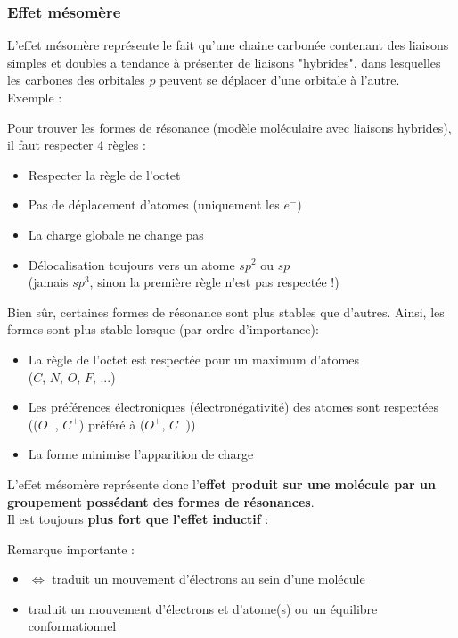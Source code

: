 \documentclass{article}
\newcommand{\insertslide}[2]{
\begin{center}
    \fbox{\texttt{[image: \#1]}}
\end{center}
}
\begin{document}
        \subsubsection{Effet mésomère}
            L'effet mésomère représente le fait qu'une chaine carbonée contenant des liaisons simples et doubles a tendance à présenter de liaisons "hybrides", dans lesquelles les carbones des orbitales $p$ peuvent se déplacer d'une orbitale à l'autre.\\
            Exemple :
            \insertslide{Slides/CM3}{32}
            Pour trouver les formes de résonance (modèle moléculaire avec liaisons hybrides), il faut respecter 4 règles :
            \begin{itemize}
                \item Respecter la règle de l'octet
                \item Pas de déplacement d'atomes (uniquement les $e^-$)
                \item La charge globale ne change pas
                \item Délocalisation toujours vers un atome $sp^2$ ou $sp$ \\(jamais $sp^3$, sinon la première règle n'est pas respectée !)
            \end{itemize}
\pagebreak
            Bien sûr, certaines formes de résonance sont plus stables que d'autres. Ainsi, les formes sont plus stable lorsque (par ordre d'importance):
            \begin{itemize}
                \item La règle de l'octet est respectée pour un maximum d'atomes \\($C$, $N$, $O$, $F$, ...)
                \item Les préférences électroniques (électronégativité) des atomes sont respectées \\(($O^-$, $C^+$) préféré à ($O^+$, $C^-$))
                \item La forme minimise l'apparition de charge
            \end{itemize}
            L'effet mésomère représente donc l'\textbf{effet produit sur une molécule par
            un groupement possédant des formes de résonances}. \\
            Il est toujours \textbf{plus fort que l'effet inductif} :
            \insertslide{Slides/CM3}{38}
            Remarque importante :\\
            \begin{itemize}
                \item $\Longleftrightarrow$ traduit un mouvement d'électrons au sein d'une molécule
                \item \ce{<=>} traduit un mouvement d'électrons et d'atome(s) ou un équilibre conformationnel
            \end{itemize}
\pagebreak
\end{document}

